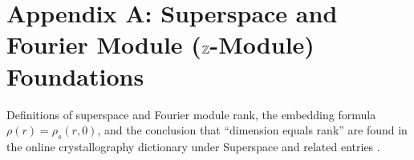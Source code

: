 \section{Appendix A: Superspace and Fourier Module ($\mathbb{Z}$-Module) Foundations}

Definitions of superspace and Fourier module rank, the embedding formula $\rho(r)=\rho_s(r,0)$, and the conclusion that ``dimension equals rank'' are found in the online crystallography dictionary under Superspace and related entries \cite{IUCRSuperspace}.
